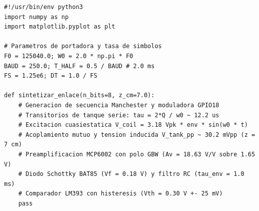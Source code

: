 \begin{lstlisting}[style=custompy, caption={Generador de oscilogramas simulados (\texttt{informe\_ieee/datos/generar\_oscilogramas\_simulados.py})}]
#!/usr/bin/env python3
import numpy as np
import matplotlib.pyplot as plt

# Parametros de portadora y tasa de simbolos
F0 = 125040.0; W0 = 2.0 * np.pi * F0
BAUD = 250.0; T_HALF = 0.5 / BAUD # 2.0 ms
FS = 1.25e6; DT = 1.0 / FS

def sintetizar_enlace(n_bits=8, z_cm=7.0):
    # Generacion de secuencia Manchester y moduladora GPIO18
    # Transitorios de tanque serie: tau = 2*Q / w0 ~ 12.2 us
    # Excitacion cuasiestatica V_coil = 3.18 Vpk * env * sin(w0 * t)
    # Acoplamiento mutuo y tension inducida V_tank_pp ~ 30.2 mVpp (z = 7 cm)
    # Preamplificacion MCP6002 con polo GBW (Av = 18.63 V/V sobre 1.65 V)
    # Diodo Schottky BAT85 (Vf = 0.18 V) y filtro RC (tau_env = 1.0 ms)
    # Comparador LM393 con histeresis (Vth = 0.30 V +- 25 mV)
    pass
\end{lstlisting}
